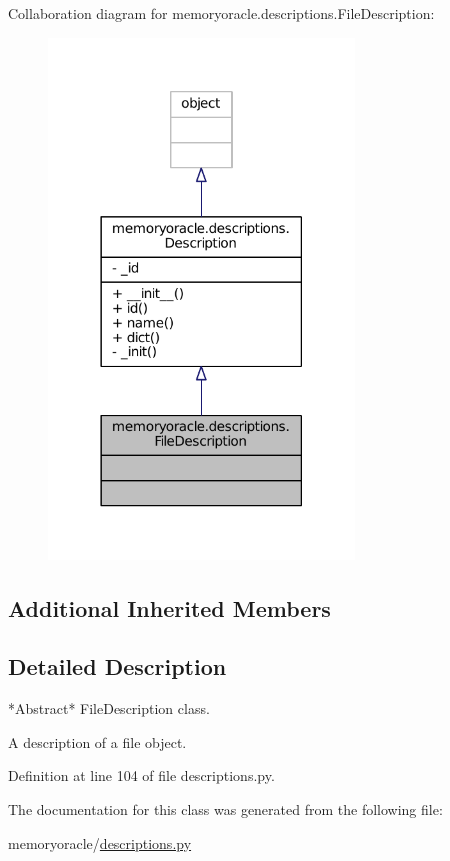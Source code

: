 Collaboration diagram for memoryoracle.\+descriptions.\+File\+Description\+:\nopagebreak
\begin{figure}[H]
\begin{center}
\leavevmode
\includegraphics[width=230pt]{classmemoryoracle_1_1descriptions_1_1FileDescription__coll__graph}
\end{center}
\end{figure}
\subsection*{Additional Inherited Members}


\subsection{Detailed Description}
\begin{DoxyVerb}*Abstract* FileDescription class.

A description of a file object.
\end{DoxyVerb}
 

Definition at line 104 of file descriptions.\+py.



The documentation for this class was generated from the following file\+:\begin{DoxyCompactItemize}
\item 
memoryoracle/\hyperlink{descriptions_8py}{descriptions.\+py}\end{DoxyCompactItemize}
